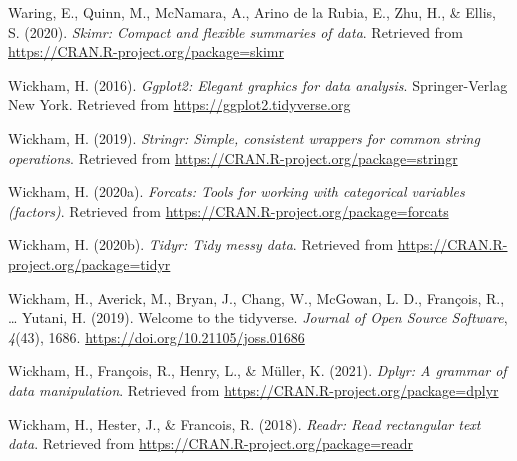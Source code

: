 \documentclass[
  english,
  man, noextraspace]{apa6}
\begin{document}
\leavevmode\hypertarget{ref-R-skimr}{}%
Waring, E., Quinn, M., McNamara, A., Arino de la Rubia, E., Zhu, H., \& Ellis, S. (2020). \emph{Skimr: Compact and flexible summaries of data}. Retrieved from \url{https://CRAN.R-project.org/package=skimr}

\leavevmode\hypertarget{ref-R-ggplot2}{}%
Wickham, H. (2016). \emph{Ggplot2: Elegant graphics for data analysis}. Springer-Verlag New York. Retrieved from \url{https://ggplot2.tidyverse.org}

\leavevmode\hypertarget{ref-R-stringr}{}%
Wickham, H. (2019). \emph{Stringr: Simple, consistent wrappers for common string operations}. Retrieved from \url{https://CRAN.R-project.org/package=stringr}

\leavevmode\hypertarget{ref-R-forcats}{}%
Wickham, H. (2020a). \emph{Forcats: Tools for working with categorical variables (factors)}. Retrieved from \url{https://CRAN.R-project.org/package=forcats}

\leavevmode\hypertarget{ref-R-tidyr}{}%
Wickham, H. (2020b). \emph{Tidyr: Tidy messy data}. Retrieved from \url{https://CRAN.R-project.org/package=tidyr}

\leavevmode\hypertarget{ref-R-tidyverse}{}%
Wickham, H., Averick, M., Bryan, J., Chang, W., McGowan, L. D., François, R., \ldots{} Yutani, H. (2019). Welcome to the tidyverse. \emph{Journal of Open Source Software}, \emph{4}(43), 1686. \url{https://doi.org/10.21105/joss.01686}

\leavevmode\hypertarget{ref-R-dplyr}{}%
Wickham, H., François, R., Henry, L., \& Müller, K. (2021). \emph{Dplyr: A grammar of data manipulation}. Retrieved from \url{https://CRAN.R-project.org/package=dplyr}

\leavevmode\hypertarget{ref-R-readr}{}%
Wickham, H., Hester, J., \& Francois, R. (2018). \emph{Readr: Read rectangular text data}. Retrieved from \url{https://CRAN.R-project.org/package=readr}

\endgroup
\end{document}
